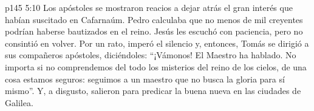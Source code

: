 \vs p145 5:10 Los apóstoles se mostraron reacios a dejar atrás el gran interés que habían suscitado en Cafarnaúm. Pedro calculaba que no menos de mil creyentes podrían haberse bautizados en el reino. Jesús les escuchó con paciencia, pero no consintió en volver. Por un rato, imperó el silencio y, entonces, Tomás se dirigió a sus compañeros apóstoles, diciéndoles: “¡Vámonos! El Maestro ha hablado. No importa si no comprendemos del todo los misterios del reino de los cielos, de una cosa estamos seguros: seguimos a un maestro que no busca la gloria para sí mismo”. Y, a disgusto, salieron para predicar la buena nueva en las ciudades de Galilea.
